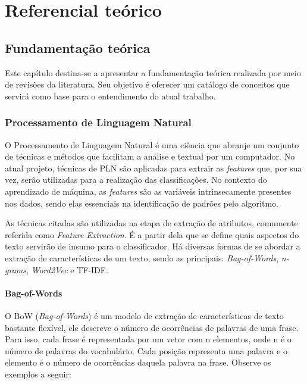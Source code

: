 \part{Referencial teórico}

\chapter[Fundamentação teórica]{Fundamentação teórica}

Este capítulo destina-se a apresentar a fundamentação teórica realizada por meio de revisões da literatura. Seu objetivo é oferecer um catálogo de conceitos que servirá como base para o entendimento do atual trabalho.

\section[Processamento de Linguagem	 Natural]{Processamento de Linguagem Natural}

O Processamento de Linguagem Natural é uma ciência que abranje um conjunto de técnicas e métodos que facilitam a análise e textual por um computador. No atual projeto, técnicas de PLN são aplicadas para extrair as \textit{features} que, por sua vez, serão utilizadas para a realização das classificações. No contexto do aprendizado de máquina, as \textit{features} são as variáveis intrinsecamente presentes nos dados, sendo elas essenciais na identificação de padrões pelo algoritmo.

As técnicas citadas são utilizadas na etapa de extração de atributos, comumente referida como \textit{Feature Extraction}. É a partir dela que se define quais aspectos do texto servirão de insumo para o classificador. Há diversas formas de se abordar a extração de características de um texto, sendo as principais: \textit{Bag-of-Words}, \textit{n-grams}, \textit{Word2Vec} e TF-IDF.

\subsection{Bag-of-Words}

O BoW (\textit{Bag-of-Words}) é um modelo de extração de características de texto bastante flexível, ele descreve o número de ocorrências de palavras de uma frase. Para isso, cada frase é representada por um vetor com n elementos, onde n é o número de palavras do vocabulário. Cada posição representa uma palavra e o elemento é o número de ocorrências daquela palavra na frase. Observe os exemplos a seguir:

